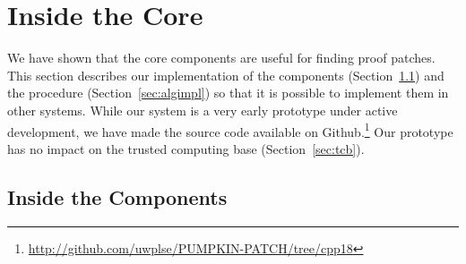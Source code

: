 \section{Inside the Core}
\label{sec:core}

We have shown that the core components are useful for finding proof patches.
This section describes our implementation of the components (Section~\ref{sec:inside})
and the procedure (Section~\ref{sec:algimpl}) so that it is possible to implement them in other systems.
While our system is a very early prototype under active development, we have made the source code available on Github.\footnote{\url{http://github.com/uwplse/PUMPKIN-PATCH/tree/cpp18}}
Our prototype has no impact on the trusted computing base (Section~\ref{sec:tcb}).






\lstset{language=coq, aboveskip=3pt,belowskip=3pt}

\subsection{Inside the Components}
\label{sec:inside}

